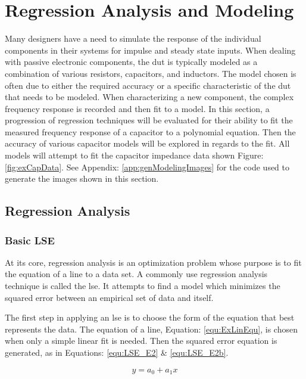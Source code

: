 \section {Regression Analysis and Modeling}
\label{sec:regression}

Many designers have a need to simulate the response of the individual components in their systems for impulse and steady state inputs. When dealing with passive electronic components, the \gls{dut} is typically modeled as a combination of various resistors, capacitors, and inductors. The model chosen is often due to either the required accuracy or a specific characteristic of the \gls{dut} that needs to be modeled. When characterizing a new component, the complex frequency response is recorded and then fit to a model. In this section, a progression of regression techniques will be evaluated for their ability to fit the measured frequency response of a capacitor to a polynomial equation. Then the accuracy of various capacitor models will be explored in regards to the fit. All models will attempt to fit the capacitor impedance data shown Figure: \ref{fig:exCapData}. See Appendix: \ref{app:genModelingImages} for the code used to generate the images shown in this section.



\subsection{Regression Analysis}
\label{sec:RegressionAnalysis}
\subsubsection{Basic LSE}
At its core, regression analysis is an optimization problem whose purpose is to fit the equation of a line to a data set. A commonly use regression analysis technique is called the \gls{lse}. It attempts to find a model which minimizes the squared error between an empirical set of data and itself.

The first step in applying an \gls{lse} is to choose the form of the equation that best represents the data. The equation of a line, Equation: \eqref{equ:ExLinEqu}, is chosen when only a simple linear fit is needed.
Then the squared error equation is generated, as in Equations: \eqref{equ:LSE_E2} \& \eqref{equ:LSE_E2b}.

\begin{equation}
\label{equ:ExLinEqu}
y = a_0 + a_1 x
\end{equation}

